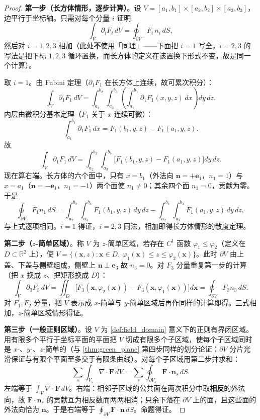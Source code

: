 \begin{proof}
\textbf{第一步（长方体情形，逐步计算）}。设 $V = [a_1,b_1] \times [a_2,b_2] \times [a_3,b_3]$，边平行于坐标轴。只需对每个分量 $i$ 证明
\[
\int_V\partial_iF_i\,dV = \oint_{\partial V}F_i\,n_i\,dS,
\]
然后对 $i=1,2,3$ 相加（此处\textbf{不}使用「同理」——下面把 $i=1$ 写全，$i=2,3$ 的写法是把下标 $1,2,3$ 循环置换，而长方体的定义在该置换下形式不变，故是同一个计算）。

取 $i=1$。由 Fubini 定理（$\partial_1F_1$ 在长方体上连续，故可累次积分）：
\[
\int_V\partial_1F_1\,dV
= \int_{a_2}^{b_2}\!\!\int_{a_3}^{b_3}\left(\int_{a_1}^{b_1}\partial_1F_1(x,y,z)\,dx\right)dy\,dz .
\]
内层由微积分基本定理（$F_1$ 关于 $x$ 连续可微）：
\[
\int_{a_1}^{b_1}\partial_1F_1\,dx = F_1(b_1,y,z)-F_1(a_1,y,z).
\]
故
\[
\int_V\partial_1F_1\,dV = \int_{a_2}^{b_2}\!\!\int_{a_3}^{b_3}\bigl[F_1(b_1,y,z)-F_1(a_1,y,z)\bigr]dy\,dz .
\]
现在算右端。长方体的六个面中，只有 $x=b_1$（外法向 $\mathbf n=+\mathbf e_1$，$n_1=1$）与 $x=a_1$（$\mathbf n=-\mathbf e_1$，$n_1=-1$）两个面使 $n_1\ne0$；其余四个面 $n_1=0$，贡献为零。于是
\[
\oint_{\partial V}F_1n_1\,dS
= \int_{a_2}^{b_2}\!\!\int_{a_3}^{b_3}F_1(b_1,y,z)\,dy\,dz
- \int_{a_2}^{b_2}\!\!\int_{a_3}^{b_3}F_1(a_1,y,z)\,dy\,dz,
\]
与上式逐项相同。$i=1$ 得证，$i=2,3$ 同法，相加即得长方体情形的散度定理。

\textbf{第二步（$z$-简单区域）}。称 $V$ 为 $z$-简单区域，若存在 $C^1$ 函数 $\varphi_1\le\varphi_2$（定义在 $D\subset\mathbb R^2$ 上），使 $V=\{(\mathbf x,z):\mathbf x\in D,\ \varphi_1(\mathbf x)\le z\le\varphi_2(\mathbf x)\}$。此时 $\partial V$ 由上盖、下盖与侧壁组成，侧壁上 $\mathbf n\perp\mathbf e_3$ 故 $n_3=0$。对 $F_3$ 分量重复第一步的计算（把 $x$ 换成 $z$、把矩形换成 $D$）：
\[
\int_V\partial_3F_3\,dV = \iint_D\bigl[F_3(\mathbf x,\varphi_2(\mathbf x))-F_3(\mathbf x,\varphi_1(\mathbf x))\bigr]d\mathbf x = \oint_{\partial V}F_3n_3\,dS .
\]
对 $F_1,F_2$ 分量，把 $V$ 表示成 $x$-简单与 $y$-简单区域后再作同样的计算即得。三式相加，$z$-简单区域情形得证。

\textbf{第三步（一般正则区域）}。设 $V$ 为 \cref{def:field_domain} 意义下的正则有界闭区域。用有限多个平行于坐标平面的平面把 $V$ 切成有限多个子区域，使每个子区域同时是 $x$-、$y$-、$z$-简单的（与 \cref{thm:green_plane} 第四步同样的划分论证：$\partial V$ 分片光滑保证与有限个平面至多交于有限条曲线）。对每个子区域用第二步并求和：
\[
\sum_s\int_{V_s}\nabla\cdot\mathbf F\,dV = \sum_s\oint_{\partial V_s}\mathbf F\cdot\mathbf n_s\,dS .
\]
左端等于 $\int_V\nabla\cdot\mathbf F\,dV$。右端：相邻子区域的公共面在两次积分中取\textbf{相反}的外法向，故 $\mathbf F\cdot\mathbf n_s$ 的贡献互为相反数而两两相消；只余下落在 $\partial V$ 上的面，且这些面的外法向恰为 $\mathbf n$。于是右端等于 $\oint_{\partial V}\mathbf F\cdot\mathbf n\,dS$。命题得证。
\end{proof}

